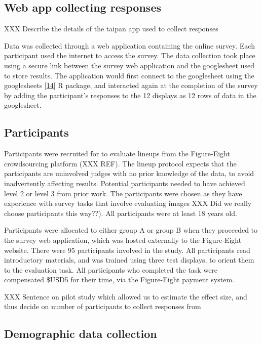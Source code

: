 \documentclass[conference,final,]{IEEEtran}
\begin{document}
\hypertarget{web-app-collecting-responses}{%
\subsection{Web app collecting responses}\label{web-app-collecting-responses}}

XXX Describe the details of the taipan app used to collect responses

Data was collected through a web application containing the online survey.
Each participant used the internet to access the survey.
The data collection took place using a secure link between the survey web application and the googlesheet used to store results. The application would first connect to the googlesheet using the googlesheets {[}\protect\hyperlink{ref-sheets}{14}{]} R package, and interacted again at the completion of the survey by adding the participant's responses to the 12 displays as 12 rows of data in the googlesheet.

\hypertarget{participants}{%
\subsection{Participants}\label{participants}}

Participants were recruited for to evaluate lineups from the Figure-Eight crowdsourcing platform (XXX REF).
The lineup protocol expects that the participants are uninvolved judges with no prior knowledge of the data, to avoid inadvertently affecting results. Potential participants needed to have achieved level 2 or level 3 from prior work. The participants were chosen as they have experience with survey tasks that involve evaluating images XXX Did we really choose participants this way??). All participants were at least 18 years old.

Participants were allocated to either group A or group B when they proceeded to the survey web application, which was hosted externally to the Figure-Eight website. There were 95 participants involved in the study. All participants read introductory materials, and was trained using three test displays, to orient them to the evaluation task. All participants who completed the task were compensated \$USD5 for their time, via the Figure-Eight payment system.

XXX Sentence on pilot study which allowed us to estimate the effect size, and thus decide on number of participants to collect responses from

\hypertarget{demographic-data-collection}{%
\subsection{Demographic data collection}\label{demographic-data-collection}}
\end{document}
